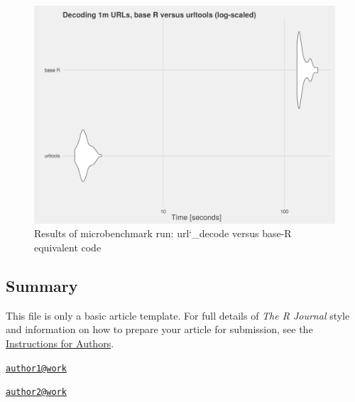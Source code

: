 \begin{figure}[h]
    \centering
    \includegraphics[scale=0.4]{decoding_benchmarks}
    \caption{Results of microbenchmark run: url\char`_decode versus base-R equivalent code}
\end{figure}

\subsection{Summary}\label{summary}

This file is only a basic article template. For full details of
\emph{The R Journal} style and information on how to prepare your
article for submission, see the
\href{http://journal.r-project.org/latex/RJauthorguide.pdf}{Instructions
for Authors}.



\address{
Oliver Keyes\\
Wikimedia Foundation\\
line 1\\ line 2\\
}
\href{mailto:author1@work}{\nolinkurl{author1@work}}

\address{
Bob Rudis\\
Rapid7\\
line 1\\ line 2\\
}
\href{mailto:author2@work}{\nolinkurl{author2@work}}

